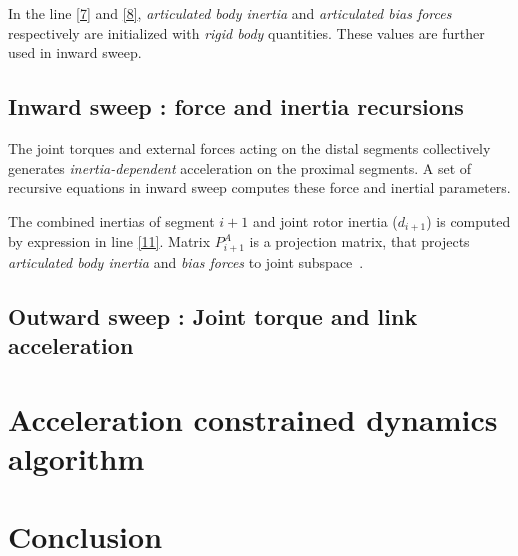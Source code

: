 In the line \ref{7} and \ref{8}, \textit{articulated body inertia} and \textit{articulated bias forces} respectively are initialized with \textit{rigid body} quantities. These values are further used in inward sweep.

\subsection{Inward sweep : force and inertia recursions}

The joint torques and external forces acting on the distal segments collectively generates \textit{inertia-dependent} acceleration on the proximal segments. A set of recursive equations in inward sweep computes these force and inertial parameters. 

The combined inertias of segment $i+1$ and joint rotor inertia ($d_{i+1}$) is computed by expression in line \ref{11}. Matrix $P^A_{i+1}$ is a projection matrix, that projects \textit{articulated body inertia} and \textit{bias forces} to joint subspace~\cite{shakhimardanov2015composable}.

\subsection{Outward sweep : Joint torque and link acceleration }

\section{Acceleration constrained dynamics algorithm}

\section{Conclusion}


